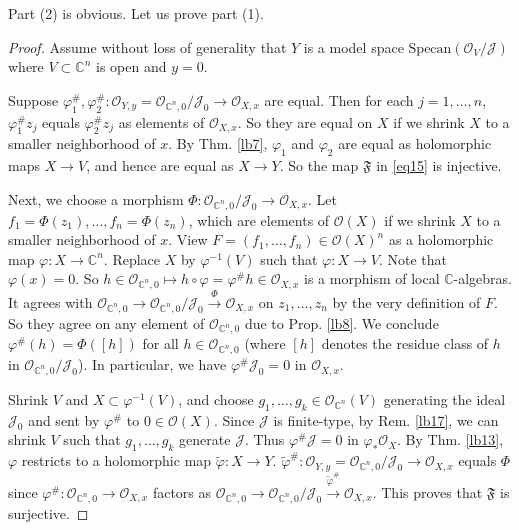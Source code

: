 \documentclass[12pt,b5paper,notitlepage]{report}
\theoremstyle{definition}
\theoremstyle{plain}
\newcommand{\fk}{\mathfrak}
\newcommand{\mc}{\mathcal}
\newcommand{\wtd}{\widetilde}
\newcommand{\scr}{\mathscr}
\newcommand{\Cbb}{\mathbb C}
\newcommand{\Specan}{\mathrm{Specan}}
\numberwithin{equation}{section}
\begin{document}
Part (2) is obvious. Let us prove part (1).


\begin{proof}
Assume without loss of generality that $Y$ is a model space $\Specan(\scr O_V/\mc J)$ where $V\subset\Cbb^n$ is open and $y=0$. 

Suppose $\varphi_1^\#,\varphi_2^\#:\scr O_{Y,y}=\scr O_{\Cbb^n,0}/\mc J_0\rightarrow\scr O_{X,x}$ are equal. Then for each $j=1,\dots,n$, $\varphi_1^\#z_j$ equals $\varphi_2^\#z_j$ as elements of $\scr O_{X,x}$. So they are equal on $X$ if we shrink $X$ to a smaller neighborhood of $x$. By Thm. \ref{lb7}, $\varphi_1$ and $\varphi_2$ are equal as holomorphic maps $X\rightarrow V$, and hence are equal as $X\rightarrow Y$. So the map $\fk F$ in \eqref{eq15} is injective.

Next, we choose a morphism $\Phi:\scr O_{\Cbb^n,0}/\mc J_0\rightarrow\scr O_{X,x}$. Let $f_1=\Phi(z_1),\dots,f_n=\Phi(z_n)$, which are elements of $\scr O(X)$ if we shrink $X$ to a smaller neighborhood of $x$. View $F=(f_1,\dots,f_n)\in\scr O(X)^n$ as a holomorphic map $\varphi:X\rightarrow\Cbb^n$. Replace $X$ by $\varphi^{-1}(V)$ such that $\varphi:X\rightarrow V$. Note that $\varphi(x)=0$. So $h\in\scr O_{\Cbb^n,0}\mapsto h\circ \varphi=\varphi^\#h\in\scr O_{X,x}$ is a morphism of local $\Cbb$-algebras. It agrees with $\scr O_{\Cbb^n,0}\rightarrow\scr O_{\Cbb^n,0}/\mc J_0\xrightarrow{\Phi}\scr O_{X,x}$ on $z_1,\dots,z_n$ by the very definition of $F$. So they agree on any element of $\scr O_{\Cbb^n,0}$ due to Prop. \ref{lb8}. We conclude $\varphi^\#(h)=\Phi([h])$  for all $h\in\scr O_{\Cbb^n,0}$ (where $[h]$ denotes the residue class of $h$ in $\scr O_{\Cbb^n,0}/\mc J_0$). In particular, we have $\varphi^\#\mc J_0=0$ in $\scr O_{X,x}$.

Shrink $V$ and $X\subset\varphi^{-1}(V)$, and choose $g_1,\dots,g_k\in\scr O_{\Cbb^n}(V)$ generating the ideal $\mc J_0$ and sent by $\varphi^\#$ to $0\in\scr O(X)$. Since $\mc J$ is finite-type, by Rem. \ref{lb17}, we can shrink $V$ such that $g_1,\dots,g_k$ generate $\mc J$. Thus $\varphi^\#\mc J=0$ in $\varphi_*\scr O_X$. By Thm. \ref{lb13}, $\varphi$ restricts to a holomorphic map $\wtd\varphi:X\rightarrow Y$. $\wtd\varphi^\#:\scr O_{Y,y}=\scr O_{\Cbb^n,0}/\mc J_0\rightarrow\scr O_{X,x}$ equals $\Phi$ since $\varphi^\#:\scr O_{\Cbb^n,0}\rightarrow\scr O_{X,x}$ factors as $\scr O_{\Cbb^n,0}\rightarrow\scr O_{\Cbb^n,0}/\mc J_0\xrightarrow{\wtd\varphi^\#}\scr O_{X,x}$. This proves that $\fk F$ is surjective.
\end{proof}
\end{document}
